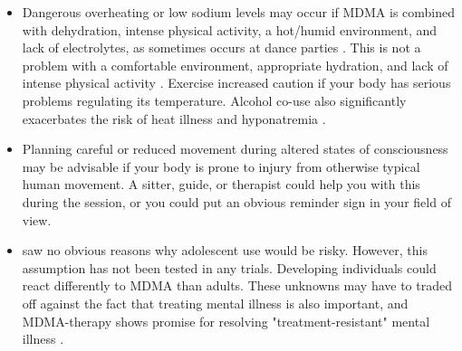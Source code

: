 \documentclass[12pt,letterpaper]{book}
\begin{document}
\begin{itemize}
    \item Dangerous overheating or low sodium levels may occur if MDMA is combined with dehydration, intense physical activity, a hot/humid environment, and lack of electrolytes, as sometimes occurs at dance parties \cite{vanOverheatingAlcohol}. This is not a problem with a comfortable environment, appropriate hydration, and lack of intense physical activity \cite{mitchellMDMAClinicalTrial}. Exercise increased caution if your body has serious problems regulating its temperature. Alcohol co-use also significantly exacerbates the risk of heat illness and hyponatremia \cite{vanOverheatingAlcohol}.
    \item Planning careful or reduced movement during altered states of consciousness may be advisable if your body is prone to injury from otherwise typical human movement. A sitter, guide, or therapist could help you with this during the session, or you could put an obvious reminder sign in your field of view.
    \item \textcite{kangaslampiAdolescent} saw no obvious reasons why adolescent use would be risky. However, this assumption has not been tested in any trials. Developing individuals could react differently to MDMA than adults. These unknowns may have to traded off against the fact that treating mental illness is also important, and MDMA-therapy shows promise for resolving "treatment-resistant" mental illness \cite{mitchellMDMAClinicalTrial}.
\end{itemize}
\end{document}
